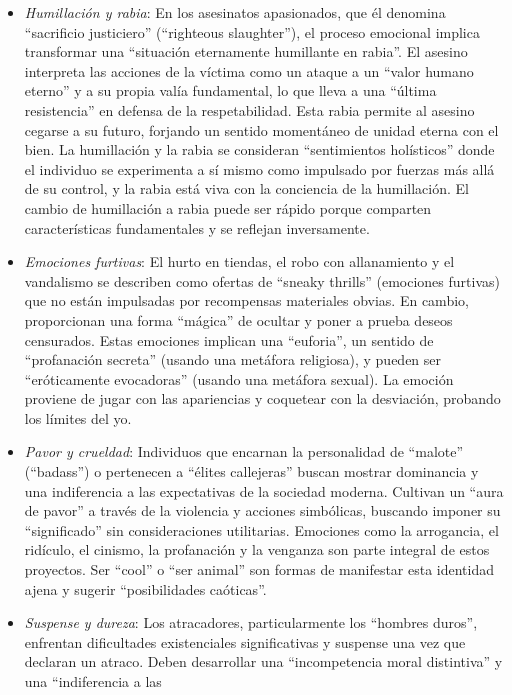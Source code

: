 \documentclass[
  spanish,
  letterpaper,
  DIV=11,
  numbers=noendperiod]{scrreprt}
\begin{document}
\begin{tcolorbox}
\begin{itemize}
\item
  \emph{Humillación y rabia}: En los asesinatos apasionados, que él
  denomina ``sacrificio justiciero'' (``righteous slaughter''), el
  proceso emocional implica transformar una ``situación eternamente
  humillante en rabia''. El asesino interpreta las acciones de la
  víctima como un ataque a un ``valor humano eterno'' y a su propia
  valía fundamental, lo que lleva a una ``última resistencia'' en
  defensa de la respetabilidad. Esta rabia permite al asesino cegarse a
  su futuro, forjando un sentido momentáneo de unidad eterna con el
  bien. La humillación y la rabia se consideran ``sentimientos
  holísticos'' donde el individuo se experimenta a sí mismo como
  impulsado por fuerzas más allá de su control, y la rabia está viva con
  la conciencia de la humillación. El cambio de humillación a rabia
  puede ser rápido porque comparten características fundamentales y se
  reflejan inversamente.
\item
  \emph{Emociones furtivas}: El hurto en tiendas, el robo con
  allanamiento y el vandalismo se describen como ofertas de ``sneaky
  thrills'' (emociones furtivas) que no están impulsadas por recompensas
  materiales obvias. En cambio, proporcionan una forma ``mágica'' de
  ocultar y poner a prueba deseos censurados. Estas emociones implican
  una ``euforia'', un sentido de ``profanación secreta'' (usando una
  metáfora religiosa), y pueden ser ``eróticamente evocadoras'' (usando
  una metáfora sexual). La emoción proviene de jugar con las apariencias
  y coquetear con la desviación, probando los límites del yo.
\item
  \emph{Pavor y crueldad}: Individuos que encarnan la personalidad de
  ``malote'' (``badass'') o pertenecen a ``élites callejeras'' buscan
  mostrar dominancia y una indiferencia a las expectativas de la
  sociedad moderna. Cultivan un ``aura de pavor'' a través de la
  violencia y acciones simbólicas, buscando imponer su ``significado''
  sin consideraciones utilitarias. Emociones como la arrogancia, el
  ridículo, el cinismo, la profanación y la venganza son parte integral
  de estos proyectos. Ser ``cool'' o ``ser animal'' son formas de
  manifestar esta identidad ajena y sugerir ``posibilidades caóticas''.
\item
  \emph{Suspense y dureza}: Los atracadores, particularmente los
  ``hombres duros'', enfrentan dificultades existenciales significativas
  y suspense una vez que declaran un atraco. Deben desarrollar una
  ``incompetencia moral distintiva'' y una ``indiferencia a las

\end{itemize}
\end{tcolorbox}
\end{document}
